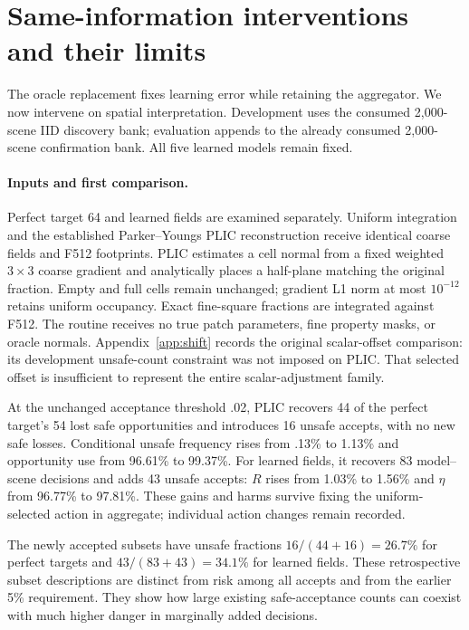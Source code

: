 \section{Same-information interventions and their limits}
\label{sec:comparison}
The oracle replacement fixes learning error while retaining the aggregator.
We now intervene on spatial interpretation. Development uses the consumed
2,000-scene IID discovery bank; evaluation appends to the already consumed
2,000-scene confirmation bank. All five learned models remain fixed.

\paragraph{Inputs and first comparison.}
Perfect target 64 and learned fields are examined separately. Uniform
integration and the established Parker--Youngs PLIC reconstruction
\citep{pilliod2004} receive identical coarse fields and F512 footprints.
PLIC estimates a cell normal from a fixed weighted $3\times3$ coarse gradient
and analytically places a half-plane matching the original fraction. Empty and
full cells remain unchanged; gradient L1 norm at most $10^{-12}$ retains uniform
occupancy. Exact fine-square fractions are integrated against F512. The routine
receives no true patch parameters, fine property masks, or oracle normals.
Appendix~\ref{app:shift} records the original scalar-offset comparison: its
 development unsafe-count constraint was not imposed on PLIC. That selected
 offset is insufficient to represent the entire scalar-adjustment family.

At the unchanged acceptance threshold .02, PLIC recovers 44 of the perfect
 target's 54 lost safe opportunities and introduces 16 unsafe accepts, with no
 new safe losses. Conditional unsafe frequency rises from .13\% to 1.13\% and
 opportunity use from 96.61\% to 99.37\%. For learned fields, it recovers 83
 model--scene decisions and adds 43 unsafe accepts: $R$ rises from 1.03\% to
 1.56\% and $\eta$ from 96.77\% to 97.81\%. These gains and harms survive fixing
 the uniform-selected action in aggregate; individual action changes remain recorded.

The newly accepted subsets have unsafe fractions $16/(44+16)=26.7\%$ for
 perfect targets and $43/(83+43)=34.1\%$ for learned fields. These retrospective
 subset descriptions are distinct from risk among all accepts and from the
 earlier 5\% requirement. They show how large existing safe-acceptance counts
 can coexist with much higher danger in marginally added decisions.

